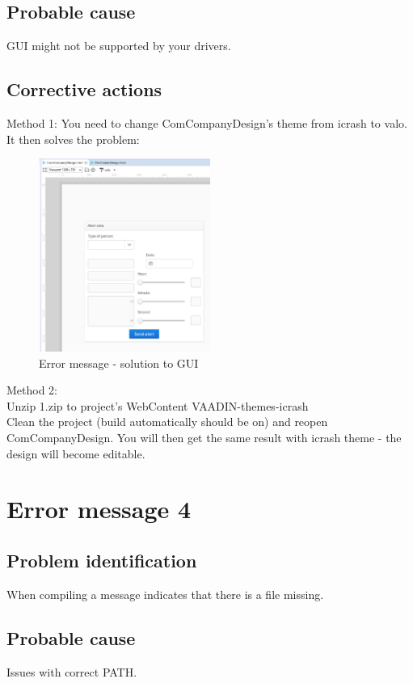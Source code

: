 \subsection{Probable cause}
GUI might not be supported by your drivers.
 
\subsection{Corrective actions}
Method 1: 
You need to change ComCompanyDesign's theme from icrash to valo.
It then solves the problem:

\begin{figure}
\begin{center}
\includegraphics[width=0.5\textwidth]{./images/er3.eps}
\end{center}
\caption{Error message - solution to GUI}
\end{figure}

Method 2:\\
Unzip 1.zip to project's WebContent VAADIN-themes-icrash\\
Clean the project (build automatically should be on) and reopen ComCompanyDesign.
You will then get the same result with icrash theme - the design will become editable.


\section{Error message 4}

\subsection{Problem identification}
When compiling a message indicates that there is a file missing.

\subsection{Probable cause}
Issues with correct PATH.

